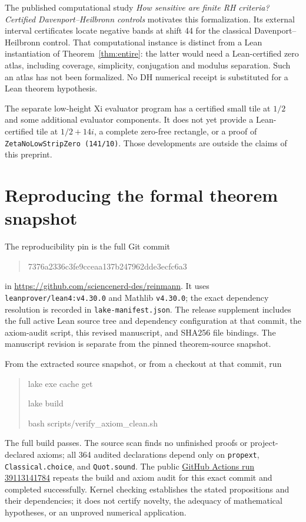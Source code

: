 \documentclass[11pt]{amsart}
\begin{document}
The published computational study \emph{How sensitive are finite RH criteria? Certified Davenport--Heilbronn controls} \cite{dhcontrols} motivates this formalization. Its external interval certificates locate negative bands at shift 44 for the classical Davenport--Heilbronn control. That computational instance is distinct from a Lean instantiation of Theorem~\ref{thm:entire}: the latter would need a Lean-certified zero atlas, including coverage, simplicity, conjugation and modulus separation. Such an atlas has not been formalized. No DH numerical receipt is substituted for a Lean theorem hypothesis.

The separate low-height Xi evaluator program has a certified small tile at $1/2$ and some additional evaluator components. It does not yet provide a Lean-certified tile at $1/2+14i$, a complete zero-free rectangle, or a proof of \texttt{ZetaNoLowStripZero (141/10)}. Those developments are outside the claims of this preprint.

\appendix
\section{Reproducing the formal theorem snapshot}\label{app:repro}
The reproducibility pin is the full Git commit
\begin{quote}\small\ttfamily
7376a2336c3fe9cceaa137b247962dde3ecfc6a3
\end{quote}
in \url{https://github.com/sciencenerd-des/reinmann}. It uses
\texttt{leanprover/lean4:v4.30.0} and Mathlib \texttt{v4.30.0}; the exact dependency
resolution is recorded in \texttt{lake-manifest.json}. The release supplement
includes the full active Lean source tree and dependency configuration at that
commit, the axiom-audit script, this revised manuscript, and SHA256 file bindings.
The manuscript revision is separate from the pinned theorem-source snapshot.

From the extracted source snapshot, or from a checkout at that commit, run
\begin{quote}\small\ttfamily\raggedright
lake exe cache get\par
lake build\par
bash scripts/verify\_axiom\_clean.sh
\end{quote}
The full build passes. The source scan finds no unfinished proofs or project-declared
axioms; all 364 audited declarations depend only on \texttt{propext},
\texttt{Classical.choice}, and \texttt{Quot.sound}. The public
\href{https://github.com/sciencenerd-des/reinmann/actions/runs/39113141784}{GitHub Actions run 39113141784}
repeats the build and axiom audit for this exact commit and completed successfully.
Kernel checking establishes the stated propositions and their dependencies; it
does not certify novelty, the adequacy of mathematical hypotheses, or an unproved
numerical application.
\end{document}
